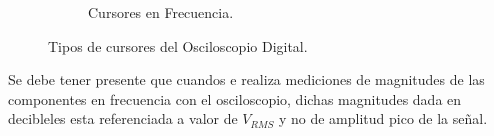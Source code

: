 \begin{figure}[H]
\begin{subfigure}[H]{0.45\textwidth}
                \caption{Cursores en Frecuencia.}
                \label{fig:CursorFrec}
                \end{subfigure}
                \caption{Tipos de cursores del Osciloscopio Digital.}
                \label{fig:CursorTipos}
            \end{figure}

        Se debe tener presente que cuandos e realiza mediciones de magnitudes de las 
        componentes en frecuencia con el osciloscopio, dichas magnitudes dada en 
        decibleles esta referenciada a valor de \(V_{RMS}\) y no de amplitud pico de la señal.
                
    

    



